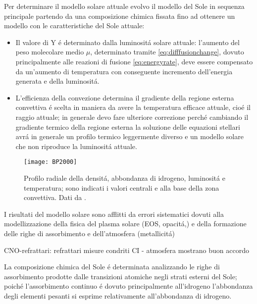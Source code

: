 \documentclass[../main.tex]{subfiles}
\begin{document}
Per determinare il modello solare attuale evolvo il modello del Sole in sequenza principale partendo da una composizione chimica fissata fino ad ottenere un modello con le caratteristiche del Sole attuale:
\begin{itemize}
\item Il valore di Y \'e determinato dalla luminosit\'a solare attuale: l'aumento del peso molecolare medio $\mu$, determinato tramite \eqref{eq:difffusionchange}, dovuto principalmente alle reazioni di fusione \eqref{eq:energyrate}, deve essere compensato da un'aumento di temperatura con conseguente incremento dell'energia generata e della luminosit\'a.

\item L'efficienza della convezione determina il gradiente della regione esterna convettiva \'e scelta in maniera da avere la temperatura efficace attuale, cio\'e il raggio attuale; in generale devo  fare ulteriore correzione perch\'e cambiando il gradiente termico della regione esterna la soluzione delle equazioni stellari avr\'a in generale un profilo termico leggermente diverso e un modello solare che non riproduce la luminosit\'a attuale.

\end{itemize}

\begin{figure}[!h]
\texttt{[image: BP2000]}
\caption{Profilo radiale della densit\'a, abbondanza di idrogeno, luminosit\'a e temperatura; sono indicati i valori centrali e alla base della zona convettiva. Dati da \cite{BP2000}.}
\end{figure}


\begin{workout}

I risultati del modello solare sono afflitti da errori sistematici dovuti alla modellizzazione della fisica del plasma solare (EOS, opacit\'a,) e della formazione delle righe di assorbimento e dell'atmosfera (metallicit\'a)
\end{workout}


\begin{workout}

CNO-refrattari: refrattari misure condriti CI - atmosfera mostrano buon accordo

\end{workout}

La composizione chimica del Sole \'e determinata analizzando le righe di assorbimento prodotte dalle transizioni atomiche negli strati esterni del Sole; poich\'e l'assorbimento continuo \'e dovuto principalmente all'idrogeno l'abbondanza degli elementi pesanti si esprime relativamente all'abbondanza di idrogeno.
\end{document}
